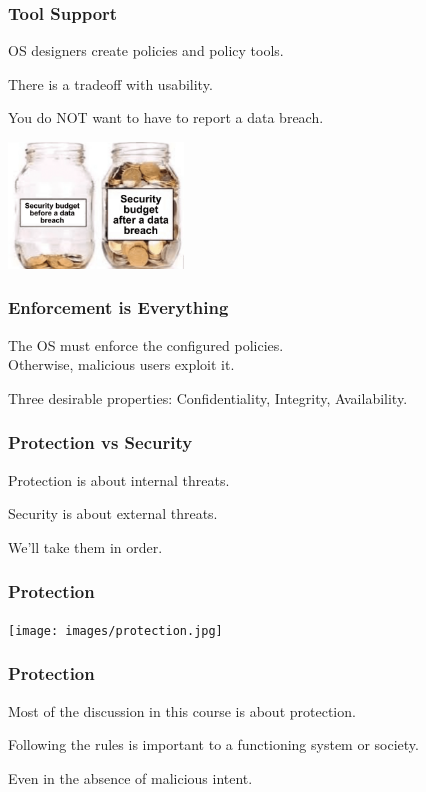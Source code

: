 \begin{frame}
\frametitle{Tool Support}

OS designers create policies and policy tools.

There is a tradeoff with usability.

You do NOT want to have to report a data breach.

\begin{center}
	\includegraphics[width=0.35\textwidth]{images/security-budget.png}
\end{center}


\end{frame}


\begin{frame}
\frametitle{Enforcement is Everything}

The OS must enforce the configured policies.\\
\quad Otherwise, malicious users exploit it.

Three desirable properties: Confidentiality, Integrity, Availability.

\end{frame}


\begin{frame}
\frametitle{Protection vs Security}

Protection is about internal threats.

Security is about external threats.

We'll take them in order.


\end{frame}


\begin{frame}
\frametitle{Protection}

\begin{center}
	\texttt{[image: images/protection.jpg]}
\end{center}


\end{frame}

\begin{frame}
\frametitle{Protection}

Most of the discussion in this course is about protection.

Following the rules is important to a functioning system or society.

Even in the absence of malicious intent.


\end{frame}


